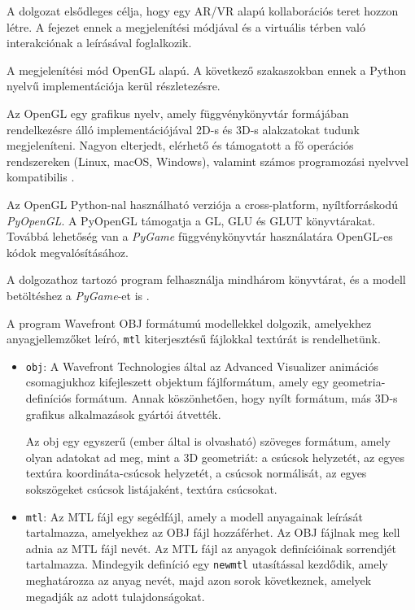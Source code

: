 


A dolgozat elsődleges célja, hogy egy AR/VR alapú kollaborációs teret hozzon létre.
A fejezet ennek a megjelenítési módjával és a virtuális térben való interakciónak a leírásával foglalkozik.


A megjelenítési mód OpenGL alapú.
A következő szakaszokban ennek a Python nyelvű implementációja kerül részletezésre.


Az OpenGL egy grafikus nyelv, amely függvénykönyvtár formájában rendelkezésre álló implementációjával 2D-s és 3D-s alakzatokat tudunk megjeleníteni. Nagyon elterjedt, elérhető és támogatott a fő operációs rendszereken (Linux, macOS, Windows), valamint számos programozási nyelvvel kompatibilis \cite{madsen2016opengl}.

Az OpenGL Python-nal használható verziója a cross-platform, nyíltforráskodú \textit{PyOpenGL}. A PyOpenGL támogatja a GL, GLU és GLUT könyvtárakat.
Továbbá lehetőség van a \textit{PyGame} függvénykönyvtár használatára OpenGL-es kódok megvalósításához.

A dolgozathoz tartozó program felhasználja mindhárom könyvtárat, és a modell betöltéshez a \textit{PyGame}-et is \cite{objloader}.


A program Wavefront OBJ formátumú modellekkel dolgozik, amelyekhez anyagjellemzőket leíró, \texttt{mtl} kiterjesztésű fájlokkal textúrát is rendelhetünk. 
\begin{itemize}
\item \texttt{obj}: A Wavefront Technologies által az Advanced Visualizer animációs csomagjukhoz kifejleszett objektum fájlformátum, amely egy geometria-definíciós formátum. 
Annak köszönhetően, hogy nyílt formátum, más 3D-s grafikus alkalmazások gyártói átvették.

Az obj egy egyszerű (ember által is olvasható) szöveges formátum, amely olyan adatokat ad meg, mint a 3D geometriát: a csúcsok helyzetét, az egyes textúra koordináta-csúcsok helyzetét, a csúcsok normálisát, az egyes sokszögeket csúcsok listájaként, textúra csúcsokat.

\item \texttt{mtl}: Az MTL fájl egy segédfájl, amely a modell anyagainak leírását tartalmazza, amelyekhez az OBJ fájl hozzáférhet. Az OBJ fájlnak meg kell adnia az MTL fájl nevét. Az MTL fájl az anyagok definícióinak sorrendjét tartalmazza. Mindegyik definíció egy \texttt{newmtl} utasítással kezdődik, amely meghatározza az anyag nevét, majd azon sorok következnek, amelyek megadják az adott tulajdonságokat.
\end{itemize} 

